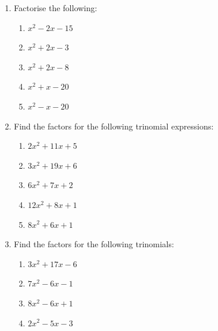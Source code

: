\begin{enumerate}[noitemsep, label=\textbf{\arabic*}. ]
{\begin{center}
\begin{xtabular*}{\mytablewidth}[t]{|p{10\mystarwidth}|p{10\mystarwidth}|p{10\mystarwidth}|}
     \tabularnewline{}
    \end{xtabular*}
      \end{center}
    \begin{center}{\small\bfseries Table 8.10}\end{center}
        }%
    \par
          \label{m39394*uid31}\item Factorise the following:
\label{m39394*id277790}\begin{enumerate}[noitemsep, label=\textbf{\alph*}. ] 
            \label{m39394*uid32}\item ${x}^{2}-2x-15$\label{m39394*uid33}\item ${x}^{2}+2x-3$\label{m39394*uid34}\item ${x}^{2}+2x-8$\label{m39394*uid35}\item ${x}^{2}+x-20$\label{m39394*uid36}\item ${x}^{2}-x-20$
\newline
\newline
\end{enumerate}
        \label{m39394*uid37}\item Find the factors for the following trinomial expressions:
\label{m39394*id277980}\begin{enumerate}[noitemsep, label=\textbf{\alph*}. ] 
            \label{m39394*uid38}\item $2{x}^{2}+11x+5$\label{m39394*uid39}\item $3{x}^{2}+19x+6$\label{m39394*uid40}\item $6{x}^{2}+7x+2$\label{m39394*uid41}\item $12{x}^{2}+8x+1$\label{m39394*uid42}\item $8{x}^{2}+6x+1$
\newline
\newline
\end{enumerate}
        \label{m39394*uid43}\item Find the factors for the following trinomials:
\label{m39394*id278184}\begin{enumerate}[noitemsep, label=\textbf{\alph*}. ] 
            \label{m39394*uid44}\item $3{x}^{2}+17x-6$\label{m39394*uid45}\item $7{x}^{2}-6x-1$\label{m39394*uid46}\item $8{x}^{2}-6x+1$\label{m39394*uid47}\item $2{x}^{2}-5x-3$
\newline
\newline
\end{enumerate}
        \end{enumerate}
